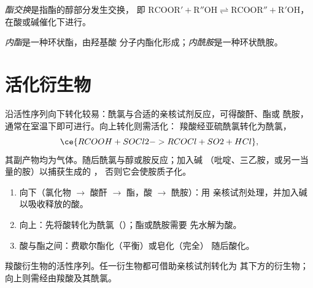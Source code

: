 \begin{definition}[酯交换]\label{def:b2:acyl-substitution:transesterification}
\emph{酯交换}是指酯的醇部分发生交换，
即 $\mathrm{RCOOR' + R''OH \rightleftharpoons RCOOR'' + R'OH}$，在酸或碱催化下进行。
\end{definition}

\begin{definition}[内酯与内酰胺]\label{def:b2:acyl-substitution:lactone}
\emph{内酯}是一种环状酯，由羟基酸
分子内酯化形成；\emph{内酰胺}是一种环状酰胺。
\end{definition}

\section{活化衍生物}

沿活性序列向下转化较易：酰氯与合适的亲核试剂反应，可得酸酐、酯或
酰胺，通常在室温下即可进行。向上转化则需活化：
羧酸经亚硫酰氯转化为酰氯，
\[
  \ce{RCOOH + SOCl2 -> RCOCl + SO2 + HCl} ,
\]
其副产物均为气体。随后酰氯与醇或胺反应；加入碱
（吡啶、三乙胺，或另一当量的胺）以捕获生成的 ，
否则它会使胺质子化。

\begin{method}[沿衍生物序列转化]\label{met:b2:acyl-substitution:ladder}
\begin{enumerate}
  \item 向下（氯化物 $\to$ 酸酐 $\to$ 酯，酸 $\to$ 酰胺）：用
        亲核试剂处理，并加入碱以吸收释放的酸。
  \item 向上：先将酸转化为酰氯（）；酯或酰胺需要
        先水解为酸。
  \item 酸与酯之间：费歇尔酯化（平衡）或皂化（完全）
        随后酸化。
\end{enumerate}
\end{method}

\begin{omfigure}

{\small 羧酸衍生物的活性序列。任一衍生物都可借助亲核试剂转化为
其下方的衍生物；向上则需经由羧酸及其酰氯。}
\end{omfigure}

